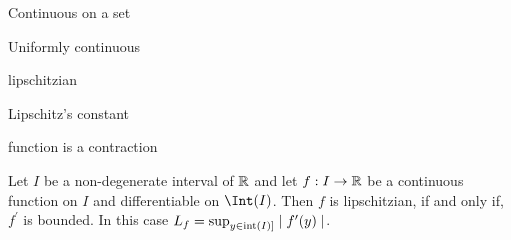 \begin{definition}
Continuous on a set	
\end{definition}

\begin{definition}
Uniformly continuous	
\end{definition}

\begin{definition}
lipschitzian	
\end{definition}

\begin{definition}
	Lipschitz's constant
\end{definition}

\begin{definition}
	function is a contraction
\end{definition}

\begin{theorem}
	Let $I$ be a non-degenerate interval of $\mathbb{R}$ and let $f : I \to \mathbb{R}$ be a continuous function on $I$ and differentiable on $\Int(I)$. Then $f$ is lipschitzian, if and only if, $f^\prime$ is bounded. In this case $L_f = \sup _{y \in \operatorname{int}(I)]} \mid f^\prime (y) \mid$.
\end{theorem}
